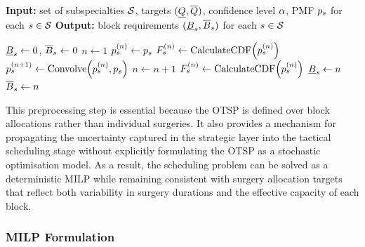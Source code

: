\begin{algorithm}[H]
\scriptsize{
\caption{Block demand estimation via successive convolutions\label{alg:blockdemand}}
\begin{algorithmic}[1]
\State \textbf{Input:} set of subspecialties $\mathcal{S}$, targets $(\underline{Q},\overline{Q})$, confidence level $\alpha$, PMF $p_{s}$ for each $s \in \mathcal{S}$
\State \textbf{Output:} block requirements $(\underline{B}_{s},\overline{B}_{s})$ for each $s \in \mathcal{S}$

        \State $\underline{B}_{s} \gets 0$, $\overline{B}_{s} \gets 0$
    \Else
            \State $n \gets 1$
            \State $p_{s}^{(n)} \gets p_{s}$
            \State $F_{s}^{(n)} \gets \text{CalculateCDF}\!\left(p_{s}^{(n)}\right)$
                \State $p_{s}^{(n+1)} \gets \text{Convolve}\!\left(p_{s}^{(n)}, p_{s}\right)$
                \State $n \gets n + 1$
                \State $F_{s}^{(n)} \gets \text{CalculateCDF}\!\left(p_{s}^{(n)}\right)$
            \EndWhile
            \If{$\targetq = \lowq$}
                \State $\underline{B}_{s} \gets n$
            \Else
                \State $\overline{B}_{s} \gets n$
            \EndIf
        \EndFor
    \EndIf
\EndFor
\end{algorithmic}
}
\end{algorithm}

This preprocessing step is essential because the OTSP is defined over block allocations rather than individual surgeries. 
It also provides a mechanism for propagating the uncertainty captured in the strategic layer into the tactical scheduling stage without explicitly formulating the OTSP as a stochastic optimisation model. 
As a result, the scheduling problem can be solved as a deterministic MILP while remaining consistent with surgery allocation targets that reflect both variability in surgery durations and the effective capacity of each block.

\subsubsection{MILP Formulation}

